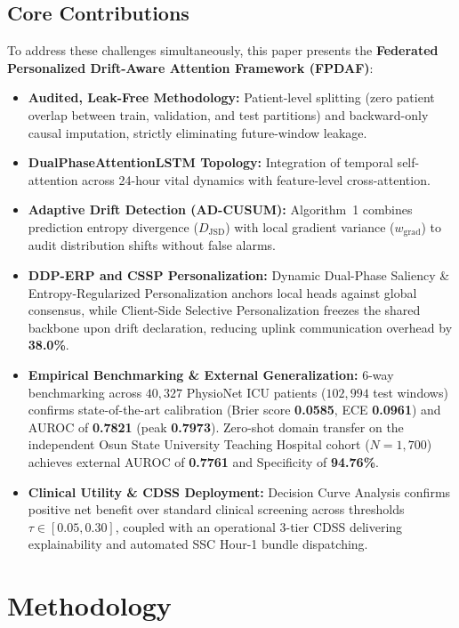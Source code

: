 \documentclass[10pt,a4paper,twocolumn,twoside]{article}
\begin{document}
\subsection{Core Contributions}
To address these challenges simultaneously, this paper presents the \textbf{Federated Personalized Drift-Aware Attention Framework (FPDAF)}:
\begin{itemize}
    \item \textbf{Audited, Leak-Free Methodology:} Patient-level splitting (zero patient overlap between train, validation, and test partitions) and backward-only causal imputation, strictly eliminating future-window leakage.
    \item \textbf{DualPhaseAttentionLSTM Topology:} Integration of temporal self-attention across 24-hour vital dynamics with feature-level cross-attention.
    \item \textbf{Adaptive Drift Detection (AD-CUSUM):} Algorithm~1 combines prediction entropy divergence ($D_{\text{JSD}}$) with local gradient variance ($w_{\text{grad}}$) to audit distribution shifts without false alarms.
    \item \textbf{DDP-ERP and CSSP Personalization:} Dynamic Dual-Phase Saliency \& Entropy-Regularized Personalization anchors local heads against global consensus, while Client-Side Selective Personalization freezes the shared backbone upon drift declaration, reducing uplink communication overhead by \textbf{38.0\%}.
    \item \textbf{Empirical Benchmarking \& External Generalization:} 6-way benchmarking across $40,327$ PhysioNet ICU patients ($102,994$ test windows) confirms state-of-the-art calibration (Brier score \textbf{0.0585}, ECE \textbf{0.0961}) and AUROC of \textbf{0.7821} (peak \textbf{0.7973}). Zero-shot domain transfer on the independent Osun State University Teaching Hospital cohort ($N=1,700$) achieves external AUROC of \textbf{0.7761} and Specificity of \textbf{94.76\%}.
    \item \textbf{Clinical Utility \& CDSS Deployment:} Decision Curve Analysis confirms positive net benefit over standard clinical screening across thresholds $\tau \in [0.05, 0.30]$, coupled with an operational 3-tier CDSS delivering explainability and automated SSC Hour-1 bundle dispatching.
\end{itemize}

\section{Methodology}
\end{document}
